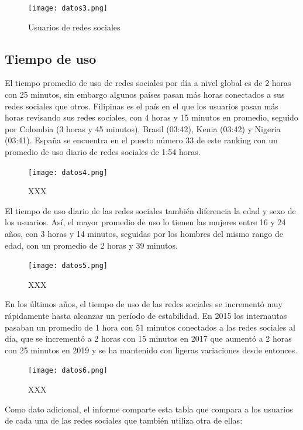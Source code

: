 \begin{figure}[ht!]
    \texttt{[image: datos3.png]}
    \caption{Usuarios de redes sociales}
    \label{datos3}
\end{figure}

\subsection{Tiempo de uso}

El tiempo promedio de uso de redes sociales por día a nivel global es de 2 horas con 25 minutos, sin embargo algunos países pasan más horas conectados a sus redes sociales que otros. Filipinas es el país en el que los usuarios pasan más horas revisando sus redes sociales, con 4 horas y 15 minutos en promedio, seguido por Colombia (3 horas y 45 minutos), Brasil (03:42), Kenia (03:42) y Nigeria (03:41). España se encuentra en el puesto número 33 de este ranking con un promedio de uso diario de redes sociales de 1:54 horas.

\begin{figure}[ht!]
    \texttt{[image: datos4.png]}
    \caption{XXX}
    \label{datos4}
\end{figure}

El tiempo de uso diario de las redes sociales también diferencia la edad y sexo de los usuarios. Así, el mayor promedio de uso lo tienen las mujeres entre 16 y 24 años, con 3 horas y 14 minutos, seguidas por los hombres del mismo rango de edad, con un promedio de 2 horas y 39 minutos.

\begin{figure}[ht!]
    \texttt{[image: datos5.png]}
    \caption{XXX}
    \label{datos5}
\end{figure}

En los últimos años, el tiempo de uso de las redes sociales se incrementó muy rápidamente hasta alcanzar un período de estabilidad. En 2015 los internautas pasaban un promedio de 1 hora con 51 minutos conectados a las redes sociales al día, que se incrementó a 2 horas con 15 minutos en 2017 que aumentó a 2 horas con 25 minutos en 2019 y se ha mantenido con ligeras variaciones desde entonces.

\begin{figure}[ht!]
    \texttt{[image: datos6.png]}
    \caption{XXX}
    \label{datos6}
\end{figure}

Como dato adicional, el informe comparte esta tabla que compara a los usuarios de cada una de las redes sociales que también utiliza otra de ellas:

